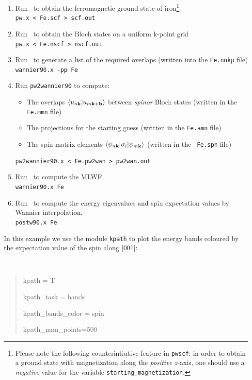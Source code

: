 \documentclass[a4paper,11pt,twoside]{article}
\begin{document}
\begin{enumerate}
\item Run \pwscf\ to obtain the ferromagnetic ground state of
  iron\footnote{Please note the following counterintiutive feature in
    {\tt pwscf}: in order to obtain a ground state with magnetization
    along the {\it positive} $z$-axis, one should use a {\it negative}
    value for the variable {\tt starting\_magnetization}.}\\
  {\tt pw.x < Fe.scf > scf.out}

\item Run \pwscf\ to obtain the Bloch states on a uniform k-point
  grid\\ 
{\tt pw.x < Fe.nscf > nscf.out}

\item Run \wannier\ to generate a list of the required overlaps (written
  into the {\tt Fe.nnkp} file)\\
{\tt wannier90.x -pp Fe}

\item Run {\tt pw2wannier90} to compute:
  \begin{itemize}
  \item{The overlaps $\langle u_{n{\bf k}}\vert u_{m{\bf k}+{\bf
          b}}\rangle$ between {\it spinor} Bloch states (written in the {\tt
        Fe.mmn} file)}
    \item{The projections for the starting guess (written in the {\tt  Fe.amn} file)}
    \item{The spin matrix elements $\langle \psi_{n{\bf k}}\vert
        \sigma_i\vert \psi_{m{\bf k}}\rangle$ (written in the {\tt
          Fe.spn} file)}
  \end{itemize}
{\tt pw2wannier90.x < Fe.pw2wan > pw2wan.out}

\item Run \wannier\ to compute the MLWF.\\
{\tt wannier90.x Fe}

\item Run \postw\ to compute the energy eigenvalues and spin
  expectation values
  by Wannier interpolation.\\
  {\tt postw90.x Fe}

\end{enumerate}

 In this example we use the module {\tt kpath} to plot the energy
  bands coloured by the expectation value of the spin along [001]:
  {\tt
\begin{quote}
kpath = T

kpath\_task = bands

kpath\_bands\_color = spin     

kpath\_num\_points=500
\end{quote} }
\end{document}
